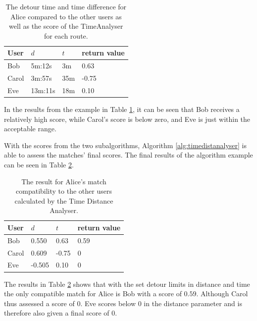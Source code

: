\begin{table}[!ht]
\centering
\begin{tabular}{@{}llll@{}}
\toprule
\textbf{User} 	& \textbf{$d$} & \textbf{$t$} 	& \textbf{return value} \\ \midrule
Bob         	& 5m:12s       & 3m			    & 0.63				\\
Carol         	& 3m:57s       & 35m	      	& -0.75       		\\
Eve           	& 13m:11s      & 18m			& 0.10        		\\ \bottomrule
\end{tabular}
\caption{The detour time and time difference for Alice compared to the other users as well as the score of the TimeAnalyser for each route.}
\label{tbl:time}
\end{table}

In the results from the example in Table \ref{tbl:time}, it can be seen that Bob receives a relatively high score, while Carol's score is below zero, and Eve is just within the acceptable range. 

With the scores from the two subalgorithms, Algorithm \ref{alg:timedistanalyser} is able to assess the matches' final scores.
The final results of the algorithm example can be seen in Table \ref{tbl:timedist}.

\begin{table}[!ht]
\centering
\begin{tabular}{@{}llll@{}}
\toprule
\textbf{User} 	& \textbf{$d$} & \textbf{$t$} 	& \textbf{return value} \\ \midrule
Bob         	& 0.550 	   & 0.63		    & 0.59					\\
Carol         	& 0.609        & -0.75	      	& 0       				\\
Eve           	& -0.505       & 0.10			& 0        				\\ \bottomrule
\end{tabular}
\caption{The result for Alice's match compatibility to the other users calculated by the Time Distance Analyser.}
\label{tbl:timedist}
\end{table}

The results in Table \ref{tbl:timedist} shows that with the set detour limits in distance and time the only compatible match for Alice is Bob with a score of $0.59$. 
Although Carol \DIFdelbegin {}\DIFdelend \DIFaddbegin {}\DIFaddend thus assessed a score of $0$.
Eve scores below 0 in the distance parameter and is therefore also given a final score of $0$.

